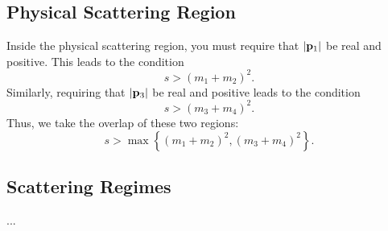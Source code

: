 \subsection{Physical Scattering Region}
Inside the physical scattering region, you must require that $\left\lvert \mathbf{p}_{1} \right\rvert$ be real and positive. This leads to the condition
\begin{equation}
	s > (m_{1} + m_{2})^{2}.
\end{equation}
Similarly, requiring that $\left\lvert \mathbf{p}_{3} \right\rvert$ be real and positive leads to the condition
\begin{equation}
	s > (m_{3} + m_{4})^{2}.
\end{equation}
Thus, we take the overlap of these two regions:
\begin{equation}
	s > \operatorname{max}{\left\lbrace (m_{1} + m_{2})^{2}, (m_{3} + m_{4})^{2} \right\rbrace}.
\end{equation}
\subsection{Scattering Regimes}
...